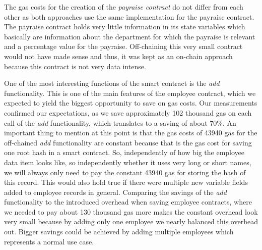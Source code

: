 The gas costs for the creation of the \textit{payraise contract} do not differ from each other as both approaches use the same implementation for the payraise contract.
The payraise contract holds very little information in its state variables which basically are information about the department for which the payraise is relevant and a percentage value for the payraise.
Off-chaining this very small contract would not have made sense and thus, it was kept as an on-chain approach because this contract is not very data intense.

One of the most interesting functions of the smart contract is the \textit{add} functionality.
This is one of the main features of the employee contract, which we expected to yield the biggest opportunity to save on gas costs.
Our measurements confirmed our expectations, as we save approximately 102 thousand gas on each call of the \textit{add} functionality, which translates to a saving of about 70\%.
An important thing to mention at this point is that the gas costs of 43940 gas for the off-chained \textit{add} functionality are constant because that is the gas cost for saving one root hash in a smart contract.
So, independently of how big the employee data item looks like, so independently whether it uses very long or short names, we will always only need to pay the constant 43940 gas for storing the hash of this record.
This would also hold true if there were multiple new variable fields added to employee records in general.
Comparing the savings of the \textit{add} functionality to the introduced overhead when saving employee contracts, where we needed to pay about 130 thousand gas more makes the constant overhead look very small because by adding only one employee we nearly balanced this overhead out.
Bigger savings could be achieved by adding multiple employees which represents a normal use case.

